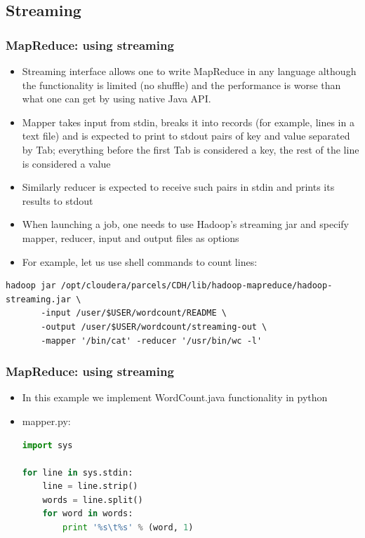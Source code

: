 \documentclass{beamer}
\begin{document}
  
\subsection{Streaming}
  \begin{frame}[fragile]
 \frametitle{MapReduce: using streaming}
 \begin{itemize}
 \item Streaming interface allows one to write MapReduce in any language although the functionality is limited (no shuffle) and the performance is worse than what one can
 get by using native Java API. 
 \item Mapper takes input from stdin, breaks it into records (for example, lines in a text file) and is expected to print to stdout pairs of key and value separated by Tab; everything before the first Tab is considered a key, the rest of the line is considered a value
 \item Similarly reducer is expected to receive such pairs in stdin and prints its results to stdout
 \item When launching a job, one needs to use Hadoop's streaming jar and specify mapper, reducer, input and output files as options
\item For example, let us use shell commands to count lines: 
 \end{itemize}

{\color{mycolorcli}
 \begin{lstlisting}[frame=single, basicstyle=\tiny]
hadoop jar /opt/cloudera/parcels/CDH/lib/hadoop-mapreduce/hadoop-streaming.jar \
       -input /user/$USER/wordcount/README \
       -output /user/$USER/wordcount/streaming-out \ 
       -mapper '/bin/cat' -reducer '/usr/bin/wc -l'
 \end{lstlisting}
}
\end{frame}

  
\begin{frame}[fragile]
 \frametitle{MapReduce: using streaming}

 \begin{itemize}
   \item In this example we implement {\color{mycolorcli}WordCount.java} functionality in python
   \item {\color{mycolorcli}mapper.py}:
{\color{mycolorcode}
  \begin{lstlisting}[frame=single, basicstyle=\tiny,language=python]
import sys

for line in sys.stdin:
    line = line.strip()
    words = line.split()
    for word in words:
        print '%s\t%s' % (word, 1)

 \end{lstlisting} 
}
 \end{itemize}

\end{frame}
\end{document}
